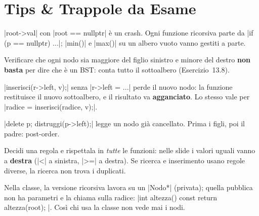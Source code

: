 \section{Tips \& Trappole da Esame}

\begin{trappola}
\cc|root->val| con \cc|root == nullptr| è un crash. Ogni funzione ricorsiva parte da
\cc|if (p == nullptr) ...|; \cc|min()| e \cc|max()| su un albero vuoto vanno gestiti a parte.
\end{trappola}

\begin{trappola}
Verificare che ogni nodo sia maggiore del figlio sinistro e minore del destro
\textbf{non basta} per dire che è un BST: conta tutto il sottoalbero
(Esercizio~13.8).
\end{trappola}

\begin{trappola}
\cc|inserisci(r->left, v);| senza \cc|r->left = ...| perde il nuovo nodo: la funzione
restituisce il nuovo sottoalbero, e il risultato va \textbf{agganciato}. Lo stesso vale
per \cc|radice = inserisci(radice, v);|.
\end{trappola}

\begin{trappola}
\cc|delete p; distruggi(p->left);| legge un nodo già cancellato. Prima i figli, poi il
padre: post-order.
\end{trappola}

\begin{trappola}[: duplicati]
Decidi una regola e rispettala in \emph{tutte} le funzioni: nelle slide i valori uguali
vanno a \textbf{destra} (\cc|<| a sinistra, \cc|>=| a destra). Se ricerca e
inserimento usano regole diverse, la ricerca non trova i duplicati.
\end{trappola}

\begin{consiglio}
Nella classe, la versione ricorsiva lavora su un \cc|Nodo*| (privata); quella pubblica
non ha parametri e la chiama sulla radice: \cc|int altezza() const { return altezza(root); }|.
Così chi usa la classe non vede mai i nodi.
\end{consiglio}

